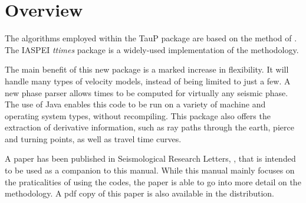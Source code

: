 
\section{Overview}


The algorithms employed within the TauP package are based on the
method of .
The IASPEI \textit{ttimes} package is a widely-used implementation of
the methodology.

The main benefit of this new package is a marked increase in flexibility. It
will handle many types of velocity models, instead of being limited to
just a few. A new phase parser allows times to be computed for virtually
any seismic phase. The use of Java enables
this code to be run on a variety of machine and operating system types,
without recompiling. This package also offers
the extraction of derivative information, such as ray paths through the
earth, pierce and turning points, as well as travel time curves.

A paper has been published in Seismological Research Letters,
,
that is intended to be used as a companion to this manual. While this manual
mainly focuses on the praticalities of using the codes,
the paper is able to go into more detail on the methodology. A pdf copy of
this paper is also available in the distribution.
